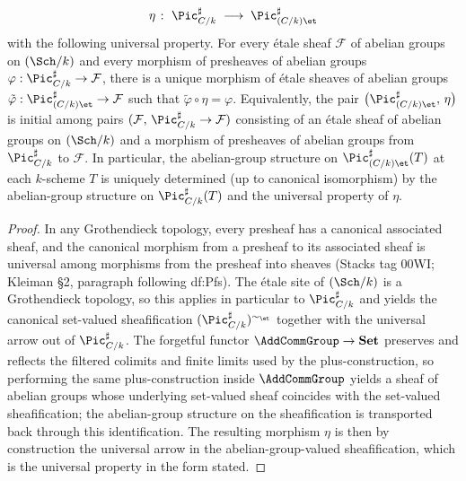 \begin{theorem}
  \[
    \eta \;\colon\; \Pic^\sharp_{C/k} \;\longrightarrow\;
    \Pic^\sharp_{(C/k)\et}
  \]
  with the following universal property. For every \'etale sheaf
  \(\mathcal{F}\) of abelian groups on \((\Sch/k)\) and every morphism
  of presheaves of abelian groups
  \(\varphi : \Pic^\sharp_{C/k} \to \mathcal{F}\), there is a unique
  morphism of \'etale sheaves of abelian groups
  \(\tilde\varphi : \Pic^\sharp_{(C/k)\et} \to \mathcal{F}\) such that
  \(\tilde\varphi \circ \eta = \varphi\). Equivalently, the pair
  \(\bigl(\Pic^\sharp_{(C/k)\et}, \, \eta\bigr)\) is initial among
  pairs \((\mathcal{F}, \, \Pic^\sharp_{C/k} \to \mathcal{F})\)
  consisting of an \'etale sheaf of abelian groups on \((\Sch/k)\) and
  a morphism of presheaves of abelian groups from \(\Pic^\sharp_{C/k}\)
  to \(\mathcal{F}\). In particular, the abelian-group structure on
  \(\Pic^\sharp_{(C/k)\et}(T)\) at each \(k\)-scheme \(T\) is uniquely
  determined (up to canonical isomorphism) by the abelian-group
  structure on \(\Pic^\sharp_{C/k}(T)\) and the universal property of
  \(\eta\).
\end{theorem}

\begin{proof}

  In any Grothendieck topology, every presheaf has a canonical
  associated sheaf, and the canonical morphism from a presheaf to its
  associated sheaf is universal among morphisms from the presheaf into
  sheaves (Stacks tag 00WI; Kleiman \S 2, paragraph following
  df:Pfs). The \'etale site of \((\Sch/k)\) is a Grothendieck
  topology, so this applies in particular to \(\Pic^\sharp_{C/k}\) and
  yields the canonical set-valued sheafification
  \((\Pic^\sharp_{C/k})^{\sim_\et}\) together with the universal arrow
  out of \(\Pic^\sharp_{C/k}\). The forgetful functor
  \(\AddCommGroup \to \mathbf{Set}\) preserves and reflects the
  filtered colimits and finite limits used by the plus-construction,
  so performing the same plus-construction inside \(\AddCommGroup\)
  yields a sheaf of abelian groups whose underlying set-valued sheaf
  coincides with the set-valued sheafification; the abelian-group
  structure on the sheafification is transported back through this
  identification. The resulting morphism \(\eta\) is then by
  construction the universal arrow in the abelian-group-valued
  sheafification, which is the universal property in the form stated.
\end{proof}

